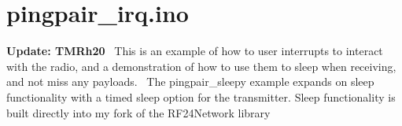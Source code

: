 \hypertarget{pingpair_irq_8ino-example}{\section{pingpair\+\_\+irq.\+ino}
}
{\bfseries Update\+: T\+M\+Rh20}~\newline
 This is an example of how to user interrupts to interact with the radio, and a demonstration of how to use them to sleep when receiving, and not miss any payloads.~\newline
 The pingpair\+\_\+sleepy example expands on sleep functionality with a timed sleep option for the transmitter. Sleep functionality is built directly into my fork of the R\+F24\+Network library~\newline



\begin{DoxyCodeInclude}
\end{DoxyCodeInclude}
 